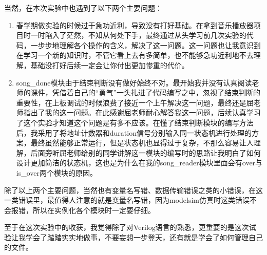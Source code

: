 \documentclass{../source/zjureport}
\begin{document}
当然，在本次实验中也遇到了以下两个主要问题：
\begin{enumerate}
    \item 春学期做实验的时候过于急功近利，导致没有打好基础。在拿到音乐播放器项目时一时陷入了茫然，不知从何处下手，最终通过从头学习前几次实验的代码，一步步地理解各个操作的含义，解决了这一问题。这一问题也让我意识到在学习一个新的知识时，不管它看上去有多简单，也不能够急功近利地不去理解，基础没打好后续一定会让你付出更加惨重的代价。
    \item song_done模块由于结束判断没有做好始终不对。最开始我并没有认真阅读老师的课件，凭借着自己的“勇气”一头扎进了代码编写之中，忽视了结束判断的重要性，在上板调试的时候浪费了接近一个上午解决这一问题，最终还是屈老师指出了我的这一问题。在此感谢屈老师耐心解答我这一问题，后续认真学习了这个实验才知道这个问题是有多不应该。在懂了结束判断模块的编写方法后，我采用了将地址计数器和duration信号分别输入同一状态机进行处理的方案，最终虽然能够正常运行，但是状态机也显得过于复杂，不那么容易让人理解，后面旁听屈老师给别的同学讲解这一模块的编写时的思路让我明白了如何设计更加简洁的状态机，这也是为什么在我的song_reader模块里面会有over与is_over两个模块的原因。
\end{enumerate}

除了以上两个主要问题，当然也有变量名写错、数据传输错误之类的小错误，在这一类错误里，最值得人注意的就是变量名写错，因为modelsim仿真时这类错误不会报错，所以在实例化各个模块时一定要仔细。

至于在这次实验中的收获，我觉得除了对Verilog语言的熟悉，更重要的是这次试验让我学会了踏踏实实地做事，不要妄想一步登天，还有就是学会了如何管理自己的文件。
\end{document}
